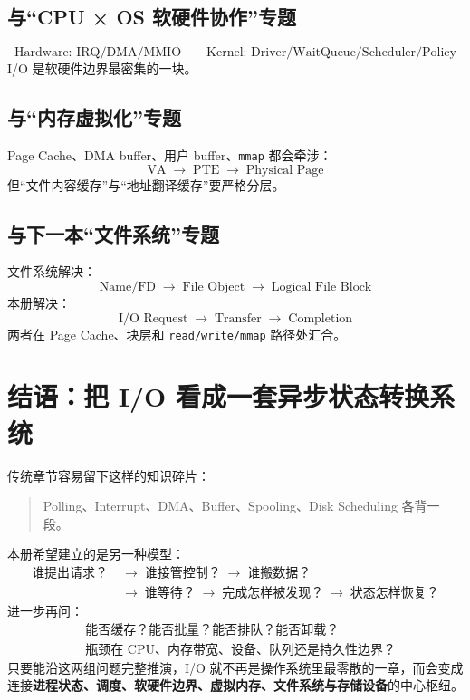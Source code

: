 \documentclass[11pt,a4paper]{ctexart}
\newcommand{\kw}[1]{\textbf{#1}}
\newcommand{\code}[1]{\texttt{#1}}
\newcommand{\arr}{\;\longrightarrow\;}
\begin{document}
\subsection{与“CPU × OS 软硬件协作”专题}
\[
\boxed{
\text{Hardware: IRQ/DMA/MMIO}
\qquad
\text{Kernel: Driver/WaitQueue/Scheduler/Policy}
}
\]
I/O 是软硬件边界最密集的一块。

\subsection{与“内存虚拟化”专题}
Page Cache、DMA buffer、用户 buffer、\code{mmap} 都会牵涉：
\[
\text{VA}\arr\text{PTE}\arr\text{Physical Page}
\]
但“文件内容缓存”与“地址翻译缓存”要严格分层。

\subsection{与下一本“文件系统”专题}
文件系统解决：
\[
\boxed{\text{Name/FD}\arr\text{File Object}\arr\text{Logical File Block}}
\]
本册解决：
\[
\boxed{\text{I/O Request}\arr\text{Transfer}\arr\text{Completion}}
\]
两者在 Page Cache、块层和 \code{read/write/mmap} 路径处汇合。

\section{结语：把 I/O 看成一套异步状态转换系统}
传统章节容易留下这样的知识碎片：
\begin{quote}
Polling、Interrupt、DMA、Buffer、Spooling、Disk Scheduling 各背一段。
\end{quote}
本册希望建立的是另一种模型：
\[
\boxed{
\begin{aligned}
\text{谁提出请求？}&\arr\text{谁接管控制？}\arr\text{谁搬数据？}\\
&\arr\text{谁等待？}\arr\text{完成怎样被发现？}\arr\text{状态怎样恢复？}
\end{aligned}}
\]
进一步再问：
\[
\boxed{
\begin{aligned}
&\text{能否缓存？能否批量？能否排队？能否卸载？}\\
&\text{瓶颈在 CPU、内存带宽、设备、队列还是持久性边界？}
\end{aligned}}
\]
只要能沿这两组问题完整推演，I/O 就不再是操作系统里最零散的一章，而会变成连接\kw{进程状态、调度、软硬件边界、虚拟内存、文件系统与存储设备}的中心枢纽。

\newpage
\end{document}
